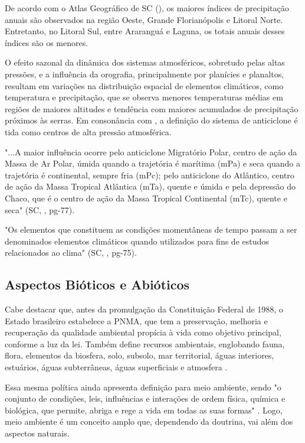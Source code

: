 \indent De acordo com o Atlas Geográfico de \acrlong{SC} (\citeyear{AtlasSCnatureza}), os maiores índices de precipitação anuais são observados na região Oeste, Grande Florianópolis e Litoral Norte. Entretanto, no Litoral Sul, entre Araranguá e Laguna, os totais anuais desses índices são os menores.

\indent O efeito sazonal da dinâmica dos sistemas atmosféricos, sobretudo pelas altas pressões, e a influência da orografia, principalmente por planícies e planaltos, resultam em variações na distribuição espacial de elementos climáticos, como temperatura e precipitação, que se observa menores temperaturas médias em regiões de maiores altitudes e tendência com maiores acumulados de precipitação próximos às serras. Em consonância com , a definição do sistema de anticiclone é tida como centros de alta pressão atmosférica.

\begin{citacao}
"...A maior influência ocorre pelo anticiclone Migratório Polar, centro de ação da Massa de Ar Polar, úmida quando a trajetória é marítima (mPa) e seca quando a trajetória é continental, sempre fria (mPc); pelo anticiclone do Atlântico, centro de ação da Massa Tropical Atlântica (mTa), quente e úmida e pela depressão do Chaco, que é o centro de ação da Massa Tropical Continental (mTc), quente e seca" (\acrlong{SC}, \citeyear{AtlasSCnatureza}, pg-77).
\end{citacao}

\indent "Os elementos que constituem as condições momentâneas de tempo passam a ser denominados elementos climáticos quando utilizados para fins de estudos relacionados ao clima" (\acrlong{SC}, \citeyear{AtlasSCnatureza}, pg-75).

\subsection{Aspectos Bióticos e Abióticos}

\indent Cabe destacar que, antes da promulgação da Constituição Federal de 1988, o Estado brasileiro estabelece a \acrfull{PNMA}, que tem a preservação, melhoria e recuperação da qualidade ambiental propícia à vida como objetivo principal, conforme a luz da lei. Também define recursos ambientais, englobando fauna, flora, elementos da biosfera, solo, subsolo, mar territorial, águas interiores, estuários, águas subterrâneas, águas superficiais e atmosfera  \cite{BRASIL1981LeiPNMA}.

\indent Essa mesma política ainda apresenta definição para meio ambiente, sendo "o conjunto de condições, leis, influências e interações de ordem física, química e biológica, que permite, abriga e rege a vida em todas as suas formas" \cite{BRASIL1981LeiPNMA}. Logo, meio ambiente é um conceito amplo que, dependendo da doutrina, vai além dos aspectos naturais.  

